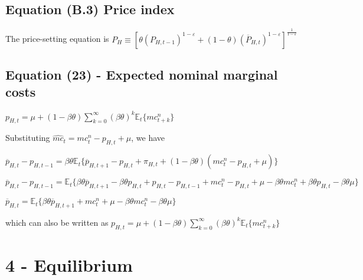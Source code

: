 \documentclass[
]{article}
\begin{document}
\vspace{12pt}

\hypertarget{equation-b.3-price-index}{%
\subsection{Equation (B.3) Price index}\label{equation-b.3-price-index}}

\vspace{8pt}

The price-setting equation is
\(\displaystyle P_H \equiv \left[ \theta (P_{H,t-1})^{1-\varepsilon} + (1-\theta)(\overline{P}_{H,t})^{1-\varepsilon}\right]^{\frac{1}{1-\varepsilon}}\)

\vspace{12pt}

\hypertarget{equation-23---expected-nominal-marginal-costs}{%
\subsection{Equation (23) - Expected nominal marginal
costs}\label{equation-23---expected-nominal-marginal-costs}}

\(\displaystyle p_{H,t}=\mu + (1-\beta \theta)\sum_{k=0}^\infty(\beta \theta)^k\mathbb{E}_t \{ mc_{t+k}^n\}\)

\vspace{8pt}

Substituting \(\widehat{mc}_t = mc_t^n-p_{H,t}+\mu\), we have

\(\overline{p}_{H,t}-p_{H,t-1}=\beta \theta \mathbb{E}_t \{ \overline{p}_{H,t+1}-p_{H,t} + \pi_{H,t}+(1-\beta \theta)(mc_t^n-p_{H,t}+\mu)\}\)

\(\overline{p}_{H,t}-p_{H,t-1} = \mathbb{E}_t \{ \beta \theta\overline{p}_{H,t+1}-\beta \theta p_{H,t} + p_{H,t}- p_{H,t-1} +mc_t^n-p_{H,t}+\mu - \beta \theta mc_t^n + \beta \theta p_{H,t} - \beta \theta \mu \}\)

\(\overline{p}_{H,t} = \mathbb{E}_t \{ \beta \theta\overline{p}_{H,t+1} +mc_t^n +\mu - \beta \theta mc_t^n - \beta \theta \mu \}\)

which can also be written as
\(\displaystyle p_{H,t}=\mu + (1-\beta \theta)\sum_{k=0}^\infty(\beta \theta)^k\mathbb{E}_t \{ mc_{t+k}^n\}\)

\vspace{12pt}

\hypertarget{equilibrium}{%
\section{4 - Equilibrium}\label{equilibrium}}
\end{document}
